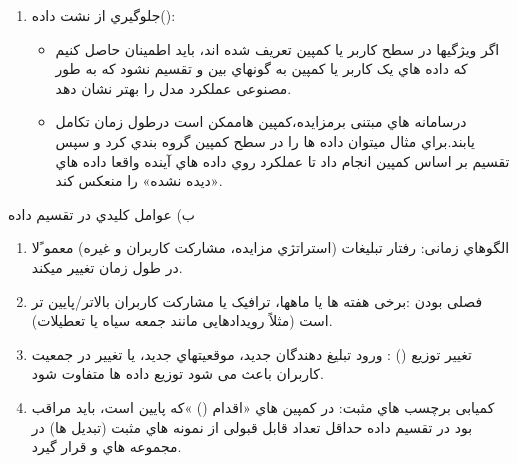 \documentclass[12pt]{article}
\begin{document}
\begin{enumerate}
{\begin{enumerate}
\begin{itemize}
            ()و سطوح عملکرد ,  و غیره داشته باشد.
            \item اینکارمانع میشودکه مثلاًیک تبلیغ دهنده یاموقعیت خاص فقط دردیتاست آموزش باشدوهرگزدر
            دیتاست  یا  مشاهده نشود.
        \end{itemize}
        \item جلوگیري از نشت داده():\\
        \begin{itemize}
            \item اگر ویژگیها در سطح کاربر یا کمپین تعریف شده اند، باید اطمینان حاصل کنیم که داده هاي یک کاربر یا
            کمپین به گونهاي بین  و  تقسیم نشود که به طور مصنوعی عملکرد مدل را بهتر نشان دهد. 
            \item درسامانه هاي مبتنی برمزایده،کمپین هاممکن است درطول زمان تکامل یابند.براي مثال میتوان داده ها
            را در سطح کمپین گروه بندي کرد و سپس تقسیم بر اساس کمپین انجام داد تا عملکرد روي داده هاي آینده 
            واقعا داده هاي «دیده نشده» را منعکس کند.
        \end{itemize}
    \end{enumerate}
    ب) عوامل کلیدي در تقسیم داده\\
    \begin{enumerate}
        \item الگوهاي زمانی: رفتار تبلیغات (استراتژي مزایده، مشارکت کاربران و غیره) معمو ًلا در طول زمان تغییر میکند.
        \item فصلی بودن :برخی هفته ها یا ماهها، ترافیک یا مشارکت کاربران بالاتر/پایین تر است (مثلاً رویدادهایی مانند جمعه سیاه
        یا تعطیلات).
        \item تغییر توزیع () : ورود تبلیغ دهندگان جدید، موقعیتهاي جدید، یا تغییر در جمعیت کاربران
        باعث می شود توزیع داده ها متفاوت شود.
        \item کمیابی برچسب هاي مثبت: در کمپین هاي «اقدام () »که  پایین است، باید مراقب بود در تقسیم
        داده حداقل تعداد قابل قبولی از نمونه هاي مثبت (تبدیل ها) در مجموعه هاي  و  قرار گیرد.
    \end{enumerate}}
    

\end{enumerate}
\end{document}

